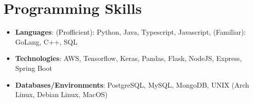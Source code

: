 \documentclass[letterpaper,10pt]{article}
\newcommand{\resumeSubHeadingListStart}{\begin{itemize}[leftmargin=*]}
\newcommand{\resumeSubHeadingListEnd}{\end{itemize}}
\begin{document}
\section{Programming Skills}
  \resumeSubHeadingListStart
    \item{
      \textbf{Languages}{: (Profficient): Python, Java, Typescript, Javascript, (Familiar): GoLang, C++, SQL}
      \hfill
    }\vspace{-5pt}
    \item{
      \textbf{Technologies}{: AWS, Tensorflow, Keras, Pandas, Flask, NodeJS, Express, Spring Boot}
      \hfill
    }\vspace{-6pt}
    \item{
      \textbf{Databases/Environments}{: PostgreSQL, MySQL, MongoDB, UNIX (Arch Linux, Debian Linux, MacOS)}
    }
  \resumeSubHeadingListEnd


\end{document}
